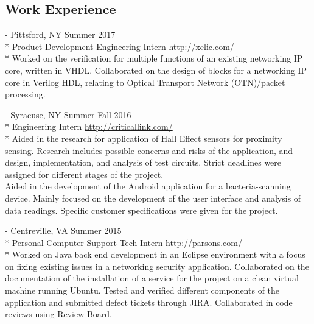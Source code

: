 \documentclass[a4paper,margin,line]{resume}
\newcommand{\rurl}[1]{\hfill {\footnotesize \url{#1}}}
\newcommand{\rdate}[1]{\hfill {\small #1}}
\renewcommand{\employer}[5]{ \item[#1] - #2 \rdate{#3} \\* #4 \rurl{#5} \\*}
\begin{document}
\begin{resume}
\section{\mysidestyle Work Experience}
    \begin{asparadesc}
        \employer{Xelic, Inc.}{Pittsford, NY}{Summer 2017}{Product Development Engineering Intern}
        {http://xelic.com/}
        \small Worked on the verification for multiple functions of an existing networking IP core, written in VHDL.  Collaborated on the design of blocks for a networking IP core in Verilog HDL, relating to Optical Transport Network (OTN)/packet processing.
        \\
        \employer{Critical Link LLC}{Syracuse, NY}{Summer-Fall 2016}{Engineering Intern}
        {http://criticallink.com/}
        \small
        Aided in the research for application of Hall Effect sensors for proximity sensing.  
        Research includes possible concerns and risks of the application, and design, implementation, and analysis of 
        test circuits.  Strict deadlines were assigned for different stages of the project.\smallskip\\
        Aided in the development of the Android application for a bacteria-scanning device.  Mainly focused on the development of the user 
        interface and analysis of data readings.  Specific customer specifications were given for the project. 
        \\
        \employer{Parsons Government Services}{Centreville, VA}{Summer 2015}{Personal Computer Support Tech Intern}
        {http://parsons.com/}
        \small
        Worked on Java back end development in an Eclipse environment with a focus on fixing existing 
        issues in a networking security application. Collaborated on the documentation of the installation 
        of a service for the project on a clean virtual machine running Ubuntu. Tested and verified 
        different components of the application and submitted defect tickets through JIRA.  Collaborated 
        in code reviews using Review Board.
        \normalsize
        \\
        
    \end{asparadesc}


\end{resume}
\end{document}
